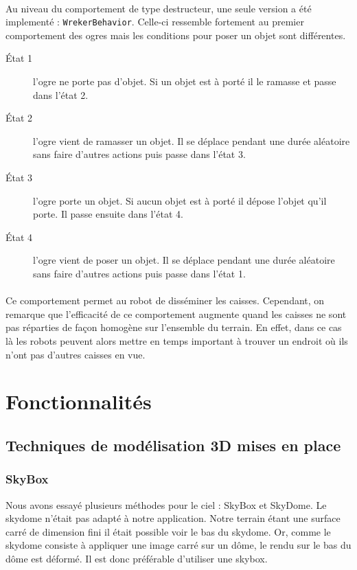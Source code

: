 \paragraph{}Au niveau du comportement de type destructeur, une seule version a
été implementé : \texttt{WrekerBehavior}. Celle-ci ressemble fortement au premier comportement des
ogres mais les conditions pour poser un objet sont différentes.

\begin{description}
    \item[\'Etat 1] l'ogre ne porte pas d'objet. Si un objet est à porté il
        le ramasse et passe dans l'état 2.
    \item[\'Etat 2] l'ogre vient de ramasser un objet. Il se déplace pendant une
        durée aléatoire sans faire d'autres actions puis passe dans l'état 3.
    \item[\'Etat 3] l'ogre porte un objet. Si aucun objet est à porté il
        dépose l'objet qu'il porte. Il passe ensuite dans
        l'état 4.
    \item[\'Etat 4] l'ogre vient de poser un objet. Il se déplace pendant une
        durée aléatoire sans faire d'autres actions puis passe dans l'état 1.
\end{description}

\paragraph{}Ce comportement permet au robot de disséminer les caisses.
Cependant, on remarque que l'efficacité de ce comportement augmente quand les
caisses ne sont pas réparties de façon homogène sur l'ensemble du terrain. En
effet, dans ce cas là les robots peuvent alors mettre en temps important à
trouver un endroit où ils n'ont pas d'autres caisses en vue.

\section{Fonctionnalités}


\subsection{Techniques de modélisation 3D mises en place}
\subsubsection{SkyBox}
Nous avons essayé plusieurs méthodes pour le ciel : SkyBox et SkyDome. Le
skydome n'était pas adapté à notre application. Notre terrain étant une
surface carré de dimension fini il était possible voir le bas du skydome.
Or, comme le skydome consiste à appliquer une image carré sur un dôme, le
rendu sur le bas du dôme est déformé. Il est donc préférable d'utiliser une
skybox.

